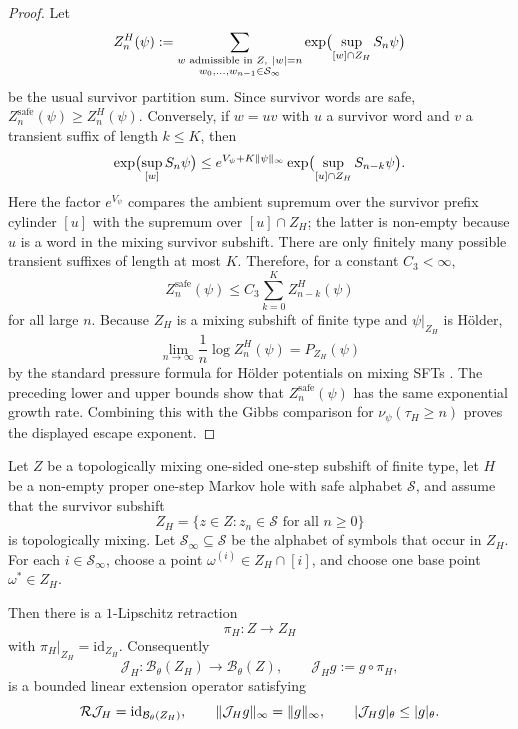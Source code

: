 \begin{proof}
Let
\[
  Z_n^{H}(\psi)
  :=
  \sum_{\substack{w\text{ admissible in }Z,\ \lvert w\rvert=n\\
                  w_0,\ldots,w_{n-1}\in\mathcal S_\infty}}
    \exp\bigl(\sup_{[w]\cap Z_H}S_n\psi\bigr)
\]
be the usual survivor partition sum.  Since survivor words are safe,
\(Z_n^{\mathrm{safe}}(\psi)\geq Z_n^H(\psi)\).  Conversely, if
\(w=uv\) with \(u\) a survivor word and \(v\) a transient suffix of
length \(k\leq K\), then
\[
  \exp\bigl(\sup_{[w]}S_n\psi\bigr)
  \leq
  e^{V_\psi+K\lVert \psi\rVert_\infty}
  \exp\bigl(\sup_{[u]\cap Z_H}S_{n-k}\psi\bigr).
\]
Here the factor \(e^{V_\psi}\) compares the ambient supremum over the
survivor prefix cylinder \([u]\) with the supremum over
\([u]\cap Z_H\); the latter is non-empty because \(u\) is a word in the
mixing survivor subshift.
There are only finitely many possible transient suffixes of length at
most \(K\).  Therefore, for a constant \(C_3<\infty\),
\[
  Z_n^{\mathrm{safe}}(\psi)
  \leq
  C_3\sum_{k=0}^{K} Z_{n-k}^{H}(\psi)
\]
for all large \(n\).  Because \(Z_H\) is a mixing subshift of finite type
and \(\psi|_{Z_H}\) is H\"older,
\[
  \lim_{n\to\infty}\frac1n\log Z_n^H(\psi)
  =
  P_{Z_H}(\psi)
\]
by the standard pressure formula for H\"older potentials on mixing SFTs
\citep{Bowen2008,Ruelle1978}.  The preceding lower and upper bounds show
that \(Z_n^{\mathrm{safe}}(\psi)\) has the same exponential growth rate.
Combining this with the Gibbs comparison for
\(\nu_\psi(\tau_H\geq n)\) proves the displayed escape exponent.
\end{proof}

\begin{lemma}
\label{lem:holder-survivor-extension}
Let \(Z\) be a topologically mixing one-sided one-step subshift of finite
type, let \(H\) be a non-empty proper one-step Markov hole with safe
alphabet \(\mathcal S\), and assume that the survivor subshift
\[
  Z_H=\{z\in Z:z_n\in\mathcal S\text{ for all }n\geq0\}
\]
is topologically mixing.  Let \(\mathcal S_\infty\subseteq\mathcal S\)
be the alphabet of symbols that occur in \(Z_H\).  For each
\(i\in\mathcal S_\infty\), choose a point
\(\omega^{(i)}\in Z_H\cap[i]\), and choose one base point
\(\omega^\ast\in Z_H\).

Then there is a \(1\)-Lipschitz retraction
\[
  \pi_H:Z\longrightarrow Z_H
\]
with \(\pi_H|_{Z_H}=\mathrm{id}_{Z_H}\).  Consequently
\[
  \mathcal J_H:\mathcal B_\theta(Z_H)\longrightarrow \mathcal B_\theta(Z),
  \qquad
  \mathcal J_H g:=g\circ\pi_H,
\]
is a bounded linear extension operator satisfying
\[
  \mathcal R\mathcal J_H=\mathrm{id}_{\mathcal B_\theta(Z_H)},
  \qquad
  \lVert \mathcal J_H g\rVert_\infty=\lVert g\rVert_\infty,
  \qquad
  \lvert \mathcal J_H g\rvert_\theta\leq\lvert g\rvert_\theta .
\]
\end{lemma}

